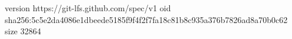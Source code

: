 version https://git-lfs.github.com/spec/v1
oid sha256:5c5e2da4086e1dbeede5185f9f4f2f7fa18c81b8c935a376b7826ad8a70b0c62
size 32864
